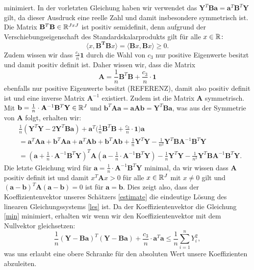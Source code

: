 minimiert. In der vorletzten Gleichung haben wir verwendet das $\mathbf{Y}^T\mathbf{B}\mathbf{a} = \mathbf{a}^T\mathbf{B}^T\mathbf{Y}$ gilt, da dieser Ausdruck eine reelle Zahl und damit insbesondere symmetrisch ist. 
Die Matrix $\mathbf{B}^T\mathbf{B} \in \mathbb{R}^{JxJ}$ ist positiv semidefinit, denn aufgrund der Verschiebungseigenschaft des Standardskalarprodukts gilt für alle $x \in \mathbb{R}\colon$
$$\langle x, \mathbf{B^T}\mathbf{B} x\rangle = \langle \mathbf{B} x, \mathbf{B} x\rangle \geq 0.$$
Zudem wissen wir dass $\frac{c_3}{n}\mathbf{1}$ durch die Wahl von $c_3$ nur positive Eigenwerte besitzt und damit positiv definit ist.  
Daher wissen wir, dass die Matrix
$$\mathbf{A} = \frac{1}{n}\mathbf{B}^T\mathbf{B} + \frac{c_3}{n} \cdot \mathbf{1}$$ ebenfalls nur positive Eigenwerte besitzt (REFERENZ), damit also positiv definit ist und eine inverse Matrix $\mathbf{A}^{-1}$ existiert. Zudem ist die Matrix $\mathbf{A}$ symmetrisch. 
Mit $\mathbf{b} = \frac{1}{n} \cdot \mathbf{A}^{-1}\mathbf{B}^T\mathbf{Y} \in \mathbb{R}^J$ und $\mathbf{b}^T\mathbf{A}\mathbf{a} = \mathbf{a}\mathbf{A}\mathbf{b} = \mathbf{Y}^T\mathbf{B}\mathbf{a}$, was aus der Symmetrie von $\mathbf{A}$ folgt, erhalten wir$\colon$
\begin{equation*}
\begin{split}
& \frac{1}{n}(\mathbf{Y}^T\mathbf{Y} - 2\mathbf{Y}^T\mathbf{B}\mathbf{a}) + \mathbf{a}^T\bigg(\frac{1}{n} \mathbf{B}^T\mathbf{B} + \frac{c_3}{n} \cdot \mathbf{1}\bigg) \mathbf{a} \\
& = \mathbf{a}^T\mathbf{A}\mathbf{a} + \mathbf{b}^T\mathbf{A}\mathbf{a} + \mathbf{a}^T\mathbf{A}\mathbf{b} + \mathbf{b}^T\mathbf{A}\mathbf{b} + \frac{1}{n}\mathbf{Y}^T\mathbf{Y} - \frac{1}{n^2}\mathbf{Y}^T\mathbf{B}\mathbf{A}^{-1}\mathbf{B}^T\mathbf{Y} \\
& = (\mathbf{a} + \frac{1}{n} \cdot \mathbf{A}^{-1}\mathbf{B}^T\mathbf{Y})^T \mathbf{A} (\mathbf{a} - \frac{1}{n} \cdot \mathbf{A}^{-1} \mathbf{B}^T\mathbf{Y}) - \frac{1}{n}\mathbf{Y}^T\mathbf{Y} - \frac{1}{n^2}\mathbf{Y}^T\mathbf{B}\mathbf{A}^{-1}\mathbf{B}^T\mathbf{Y}.
\end{split} 
\end{equation*} 
Die letzte Gleichung wird für $\mathbf{a} = \frac{1}{n} \cdot \mathbf{A}^{-1}\mathbf{B}^T\mathbf{Y}$ minimal, 
da wir wissen dass $\mathbf{A}$ positiv definit ist und damit $x^T\mathbf{A}x > 0$ für alle $x \in \mathbb{R}^J$ mit $x \neq 0$ gilt und $(\mathbf{a} - \mathbf{b})^T\mathbf{A}(\mathbf{a} - \mathbf{b}) = 0$ ist für $\mathbf{a} = \mathbf{b}$. Dies zeigt also, dass der Koeffizientenvektor unseres Schätzers \ref{estimate} die eindeutige Lösung des linearen Gleichungssystems \ref{les} ist.
Da der Koeffizientenvektor die Gleichung \ref{min} minimiert, erhalten wir wenn wir den Koeffizientenvektor mit dem Nullvektor gleichsetzen$\colon$
$$\frac{1}{n}(\mathbf{Y} - \mathbf{B}\mathbf{a})^T(\mathbf{Y} - \mathbf{B}\mathbf{a}) + \frac{c_3}{n} \cdot \mathbf{a}^T\mathbf{a} \leq \frac{1}{n} \sum_{i = 1}^n Y_i^2,$$
was uns erlaubt eine obere Schranke für den absoluten Wert unsere Koeffizienten abzuleiten.


